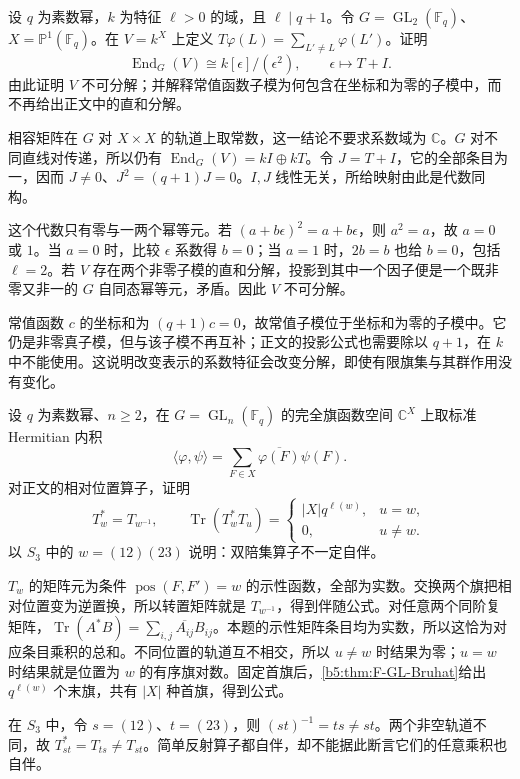 \begin{exercise}\label{b5:ex:F-modular-rank-one-hecke}
	设 \(q\) 为素数幂，\(k\) 为特征 \(\ell>0\) 的域，且 \(\ell\mid q+1\)。令 \(G=\operatorname{GL}_2(\mathbb F_q)\)、\(X=\mathbb P^1(\mathbb F_q)\)。在 \(V=k^X\) 上定义 \(T\varphi(L)=\sum_{L'\ne L}\varphi(L')\)。证明
	\[
		\operatorname{End}_G(V)\cong k[\epsilon]/(\epsilon^2),\qquad
		\epsilon\longmapsto T+I.
	\]
	由此证明 \(V\) 不可分解；并解释常值函数子模为何包含在坐标和为零的子模中，而不再给出正文中的直和分解。
\end{exercise}
\begin{solution}
	相容矩阵在 \(G\) 对 \(X\times X\) 的轨道上取常数，这一结论不要求系数域为 \(\mathbb C\)。\(G\) 对不同直线对传递，所以仍有 \(\operatorname{End}_G(V)=kI\oplus kT\)。令 \(J=T+I\)，它的全部条目为一，因而 \(J\ne0\)、\(J^2=(q+1)J=0\)。\(I,J\) 线性无关，所给映射由此是代数同构。

	这个代数只有零与一两个幂等元。若 \((a+b\epsilon)^2=a+b\epsilon\)，则 \(a^2=a\)，故 \(a=0\) 或 \(1\)。当 \(a=0\) 时，比较 \(\epsilon\) 系数得 \(b=0\)；当 \(a=1\) 时，\(2b=b\) 也给 \(b=0\)，包括 \(\ell=2\)。若 \(V\) 存在两个非零子模的直和分解，投影到其中一个因子便是一个既非零又非一的 \(G\) 自同态幂等元，矛盾。因此 \(V\) 不可分解。

	常值函数 \(c\) 的坐标和为 \((q+1)c=0\)，故常值子模位于坐标和为零的子模中。它仍是非零真子模，但与该子模不再互补；正文的投影公式也需要除以 \(q+1\)，在 \(k\) 中不能使用。这说明改变表示的系数特征会改变分解，即使有限旗集与其群作用没有变化。
\end{solution}

\begin{exercise}\label{b5:ex:F-hecke-adjoint}
	设 \(q\) 为素数幂、\(n\ge2\)，在 \(G=\operatorname{GL}_n(\mathbb F_q)\) 的完全旗函数空间 \(\mathbb C^X\) 上取标准 Hermitian 内积
	\[
		\langle\varphi,\psi\rangle=\sum_{F\in X}\overline{\varphi(F)}\psi(F).
	\]
	对正文的相对位置算子，证明
	\[
		T_w^*=T_{w^{-1}},\qquad
		\operatorname{Tr}(T_w^*T_u)=
		\begin{cases}|X|q^{\ell(w)},&u=w,\\0,&u\ne w.\end{cases}
	\]
	以 \(S_3\) 中的 \(w=(12)(23)\) 说明：双陪集算子不一定自伴。
\end{exercise}
\begin{solution}
	\(T_w\) 的矩阵元为条件 \(\operatorname{pos}(F,F')=w\) 的示性函数，全部为实数。交换两个旗把相对位置变为逆置换，所以转置矩阵就是 \(T_{w^{-1}}\)，得到伴随公式。对任意两个同阶复矩阵，\(\operatorname{Tr}(A^*B)=\sum_{i,j}\overline{A_{ij}}B_{ij}\)。本题的示性矩阵条目均为实数，所以这恰为对应条目乘积的总和。不同位置的轨道互不相交，所以 \(u\ne w\) 时结果为零；\(u=w\) 时结果就是位置为 \(w\) 的有序旗对数。固定首旗后，\cref{b5:thm:F-GL-Bruhat}给出 \(q^{\ell(w)}\) 个末旗，共有 \(|X|\) 种首旗，得到公式。

	在 \(S_3\) 中，令 \(s=(12)\)、\(t=(23)\)，则 \((st)^{-1}=ts\ne st\)。两个非空轨道不同，故 \(T_{st}^*=T_{ts}\ne T_{st}\)。简单反射算子都自伴，却不能据此断言它们的任意乘积也自伴。
\end{solution}
